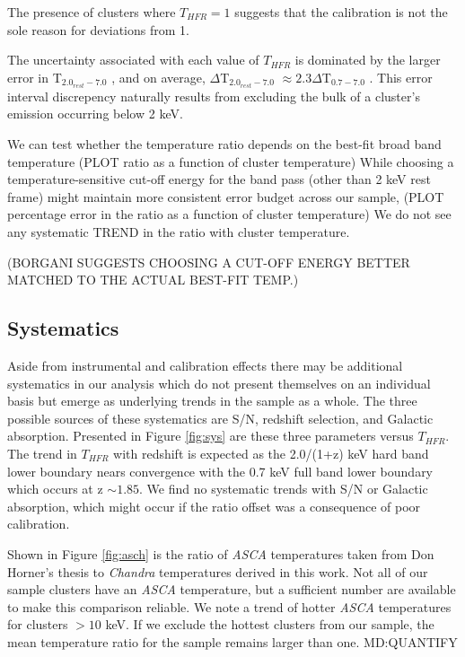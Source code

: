 \documentclass{emulateapj}
\newcommand{\tf}{T_{HFR} }
\newcommand{\hard}{T$_{2.0_{rest}-7.0}$ }
\newcommand{\full}{T$_{0.7-7.0}$ }
\begin{document}
{The presence of clusters where $\tf=1$ suggests that the calibration is not
the sole reason for deviations from 1.


The uncertainty associated with each value of $\tf$ is dominated by the larger error in
\hard, and on average, $\Delta$\hard$\approx 2.3\Delta$\full. This
error interval discrepency naturally results from excluding  the bulk of a
cluster's emission occurring below 2 keV.

We can test whether the temperature ratio depends on the best-fit broad band
temperature (PLOT ratio as a function of cluster temperature)
While choosing a temperature-sensitive cut-off energy for the band pass (other
than 2 keV rest frame) might maintain more consistent error budget across
our sample, 
(PLOT percentage error in the ratio as a function of cluster temperature)
We do not see any systematic TREND in the ratio with cluster temperature.


(BORGANI SUGGESTS CHOOSING A CUT-OFF ENERGY BETTER MATCHED
TO THE ACTUAL BEST-FIT TEMP.)

\subsection{Systematics} \label{sec:sys}

Aside from instrumental and calibration effects there may be
additional systematics in our analysis which do not present themselves
on an individual basis but emerge as underlying trends in the sample
as a whole. The three possible sources of these systematics
are S/N, redshift selection, and Galactic absorption. Presented in Figure
\ref{fig:sys} are these three parameters versus $\tf$. The trend in $\tf$
with redshift is expected as the 2.0/(1+z) keV hard band lower
boundary nears convergence with the 0.7 keV full band lower boundary which
occurs at z $\sim 1.85$. We find no systematic trends with S/N or Galactic
absorption, which might occur if the ratio offset was a consequence of 
poor calibration.

Shown in Figure \ref{fig:asch} is the ratio of {\textit{ASCA}}
temperatures taken from Don Horner's thesis to {\textit{Chandra}}
temperatures derived in this work. Not all of our sample clusters have
an {\textit{ASCA}} temperature, but a sufficient number are available
to make this comparison reliable. We
note a trend of hotter {\textit{ASCA}} temperatures for clusters $> 10$
keV. 
If we exclude the hottest clusters from our sample, the
mean temperature ratio for the sample remains larger than one.
MD:QUANTIFY


}
\end{document}
